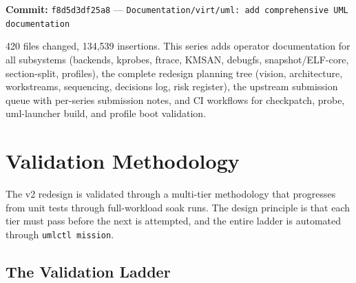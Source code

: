 \textbf{Commit:} \texttt{f8d5d3df25a8} ---
\texttt{Documentation/virt/uml: add comprehensive UML documentation}

420 files changed, 134,539 insertions.  This series adds operator
documentation for all \UML{} subsystems (backends, kprobes, ftrace,
KMSAN, debugfs, snapshot/ELF-core, section-split, profiles), the
complete redesign planning tree (vision, architecture, workstreams,
sequencing, decisions log, risk register), the upstream submission
queue with per-series submission notes, and CI workflows for
checkpatch, \KVM{} probe, uml-launcher build, and profile boot
validation.


\section{Validation Methodology}
\label{sec:v2-validation}

The v2 redesign is validated through a multi-tier methodology that
progresses from unit tests through full-workload soak runs.  The
design principle is that each tier must pass before the next is
attempted, and the entire ladder is automated through
\texttt{umlctl mission}.

\subsection{The Validation Ladder}

